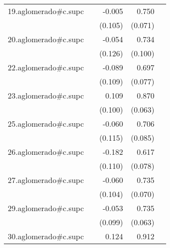 {\begin{longtable}{l*{4}{D{.}{.}{-1}}}
\addlinespace
19.aglomerado#c.supc&                     &      -0.005         &       0.750\sym{***}&                     \\
            &                     &     (0.105)         &     (0.071)         &                     \\
\addlinespace
20.aglomerado#c.supc&                     &      -0.054         &       0.734\sym{***}&                     \\
            &                     &     (0.126)         &     (0.100)         &                     \\
\addlinespace
22.aglomerado#c.supc&                     &      -0.089         &       0.697\sym{***}&                     \\
            &                     &     (0.109)         &     (0.077)         &                     \\
\addlinespace
23.aglomerado#c.supc&                     &       0.109         &       0.870\sym{***}&                     \\
            &                     &     (0.100)         &     (0.063)         &                     \\
\addlinespace
25.aglomerado#c.supc&                     &      -0.060         &       0.706\sym{***}&                     \\
            &                     &     (0.115)         &     (0.085)         &                     \\
\addlinespace
26.aglomerado#c.supc&                     &      -0.182         &       0.617\sym{***}&                     \\
            &                     &     (0.110)         &     (0.078)         &                     \\
\addlinespace
27.aglomerado#c.supc&                     &      -0.060         &       0.735\sym{***}&                     \\
            &                     &     (0.104)         &     (0.070)         &                     \\
\addlinespace
29.aglomerado#c.supc&                     &      -0.053         &       0.735\sym{***}&                     \\
            &                     &     (0.099)         &     (0.063)         &                     \\
\addlinespace
30.aglomerado#c.supc&                     &       0.124         &       0.912\sym{***}&                     \\

\end{longtable}}
